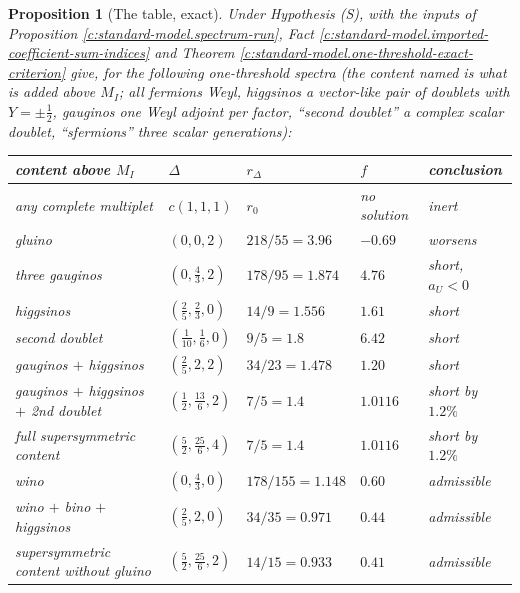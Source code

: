 \documentclass[11pt]{article}
\newtheorem{proposition}[theorem]{Proposition}
\theoremstyle{definition}
\theoremstyle{plain}
\newcommand{\changedmark}[2]{\marginpar{\raggedright\scriptsize\color{#1}#2}}
\providecommand{\Dl}{}\renewcommand{\Dl}{\Delta}
\begin{document}
\begin{proposition}[The table, exact]\label{c:standard-model.table-exact}
\changedmark{gray}{reworded}
Under Hypothesis (S), with the inputs of Proposition \ref{c:standard-model.spectrum-run}, Fact \ref{c:standard-model.imported-coefficient-sum-indices} and Theorem \ref{c:standard-model.one-threshold-exact-criterion} give, for the following one-threshold spectra (the content named is what is added above $M_{I}$; all fermions Weyl, higgsinos a vector-like pair of doublets with $Y = \pm\tfrac12$, gauginos one Weyl adjoint per factor, ``second doublet'' a complex scalar doublet, ``sfermions'' three scalar generations):
\begin{center}\small
\begin{tabular}{@{}lllll@{}}
\toprule
content above $M_{I}$ & $\Dl$ & $r_{\Dl}$ & $f$ & conclusion \\
\midrule
any complete multiplet & $c(1,1,1)$ & $r_{0}$ & no solution & inert \\
gluino & $(0, 0, 2)$ & $218/55 = 3.96$ & $-0.69$ & worsens \\
three gauginos & $(0, \tfrac43, 2)$ & $178/95 = 1.874$ & $4.76$ & short, $a_{U} < 0$ \\
higgsinos & $(\tfrac25, \tfrac23, 0)$ & $14/9 = 1.556$ & $1.61$ & short \\
second doublet & $(\tfrac{1}{10}, \tfrac16, 0)$ & $9/5 = 1.8$ & $6.42$ & short \\
gauginos $+$ higgsinos & $(\tfrac25, 2, 2)$ & $34/23 = 1.478$ & $1.20$ & short \\
gauginos $+$ higgsinos $+$ 2nd doublet & $(\tfrac12, \tfrac{13}{6}, 2)$ & $7/5 = 1.4$ & $1.0116$ & short by $1.2\%$ \\
full supersymmetric content & $(\tfrac52, \tfrac{25}{6}, 4)$ & $7/5 = 1.4$ & $1.0116$ & short by $1.2\%$ \\
wino & $(0, \tfrac43, 0)$ & $178/155 = 1.148$ & $0.60$ & admissible \\
wino $+$ bino $+$ higgsinos & $(\tfrac25, 2, 0)$ & $34/35 = 0.971$ & $0.44$ & admissible \\
supersymmetric content without gluino & $(\tfrac52, \tfrac{25}{6}, 2)$ & $14/15 = 0.933$ & $0.41$ & admissible \\
\bottomrule
\end{tabular}
\end{center}

\end{proposition}
\end{document}
